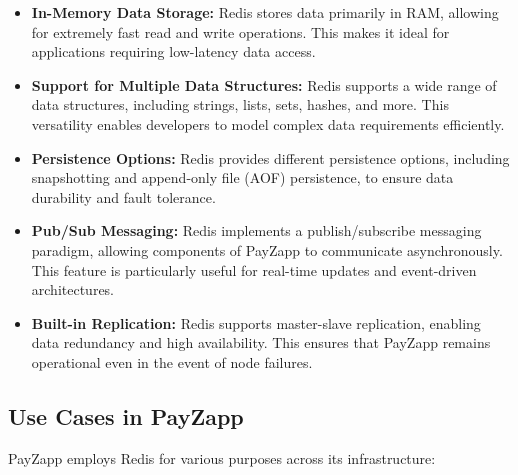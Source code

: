 \documentclass[12pt,a4paper]{report}
\begin{document}
\begin{itemize}
    \item \textbf{In-Memory Data Storage:} Redis stores data primarily in RAM, allowing for extremely fast read and write operations. This makes it ideal for applications requiring low-latency data access.
    
    \item \textbf{Support for Multiple Data Structures:} Redis supports a wide range of data structures, including strings, lists, sets, hashes, and more. This versatility enables developers to model complex data requirements efficiently.
    
    \item \textbf{Persistence Options:} Redis provides different persistence options, including snapshotting and append-only file (AOF) persistence, to ensure data durability and fault tolerance.
    
    \item \textbf{Pub/Sub Messaging:} Redis implements a publish/subscribe messaging paradigm, allowing components of PayZapp to communicate asynchronously. This feature is particularly useful for real-time updates and event-driven architectures.
    
    \item \textbf{Built-in Replication:} Redis supports master-slave replication, enabling data redundancy and high availability. This ensures that PayZapp remains operational even in the event of node failures.
\end{itemize}

\subsection{Use Cases in PayZapp}

PayZapp employs Redis for various purposes across its infrastructure:
\end{document}
